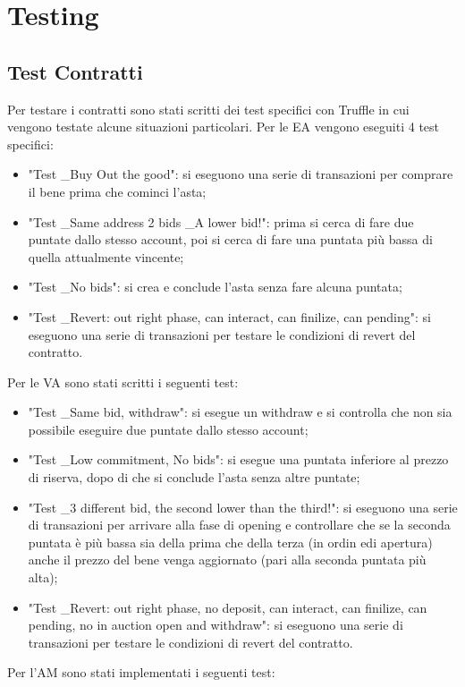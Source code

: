 \section{Testing}
\subsection{Test Contratti}
Per testare i contratti sono stati scritti dei test specifici con Truffle in cui vengono testate alcune situazioni particolari. Per le EA vengono eseguiti 4 test specifici:
\begin{itemize}
	\item "Test \_Buy Out the good": si eseguono una serie di transazioni per comprare il bene prima che cominci l'asta;
	\item "Test \_Same address 2 bids \_A lower bid!": prima si cerca di fare due puntate dallo stesso account, poi si cerca di fare una puntata più bassa di quella attualmente vincente;
	\item "Test \_No bids": si crea e conclude l'asta senza fare alcuna puntata;
	\item "Test \_Revert: out right phase, can interact, can finilize, can pending": si eseguono una serie di transazioni per testare le condizioni di revert del contratto.
\end{itemize}
Per le VA sono stati scritti i seguenti test:
\begin{itemize}
	\item "Test \_Same bid, withdraw": si esegue un withdraw e si controlla che non sia possibile eseguire due puntate dallo stesso account;
	\item "Test \_Low commitment, No bids": si esegue una puntata inferiore al prezzo di riserva, dopo di che si conclude l'asta senza altre puntate;
	\item "Test \_3 different bid, the second lower than the third!": si eseguono una serie di transazioni per arrivare alla fase di opening e controllare che se la seconda puntata è più bassa sia della prima che della terza (in ordin edi apertura) anche il prezzo del bene venga aggiornato (pari alla seconda puntata più alta);
	\item "Test \_Revert: out right phase, no deposit, can interact, can finilize, can pending, no in auction open and withdraw": si eseguono una serie di transazioni per testare le condizioni di revert del contratto.
\end{itemize}
Per l'AM sono stati implementati i seguenti test:
